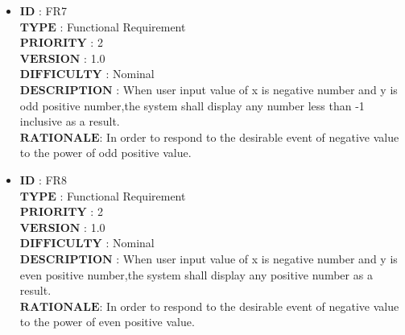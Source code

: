 \documentclass[a4paper, 11pt]{article}
\begin{document}
\begin{itemize}
   \item $\boldsymbol{ID}$\hspace{2.95cm}   : FR7\\
   $\boldsymbol{TYPE}$\hspace{2.2cm}   : Functional Requirement\\
   $\boldsymbol{PRIORITY}$\hspace{1.05cm} : 2\\
   $\boldsymbol{VERSION}$\hspace{1.25cm} : 1.0\\
   $\boldsymbol{DIFFICULTY}$\hspace{0.4cm} : Nominal \\
   $\boldsymbol{DESCRIPTION}$    : When user input value of x is negative number and y is odd positive number,the system shall display any number less than -1 inclusive as a result.\\
    $\boldsymbol{RATIONALE}$\hspace{0.8cm}: In order to respond to the desirable event of negative value to the power of odd positive value.\\
   
   \item $\boldsymbol{ID}$\hspace{2.95cm}   : FR8\\
    $\boldsymbol{TYPE}$\hspace{2.2cm}   : Functional Requirement\\
   $\boldsymbol{PRIORITY}$\hspace{1.05cm} : 2\\
   $\boldsymbol{VERSION}$\hspace{1.25cm} : 1.0\\
   $\boldsymbol{DIFFICULTY}$\hspace{0.4cm} : Nominal \\
   $\boldsymbol{DESCRIPTION}$    : When user input value of x is negative number and y is even positive number,the system shall display any positive number as a result.\\
   $\boldsymbol{RATIONALE}$\hspace{0.8cm}: In order to respond to the desirable event of negative value to the power of even positive value.\\
   

\end{itemize}
\end{document}

